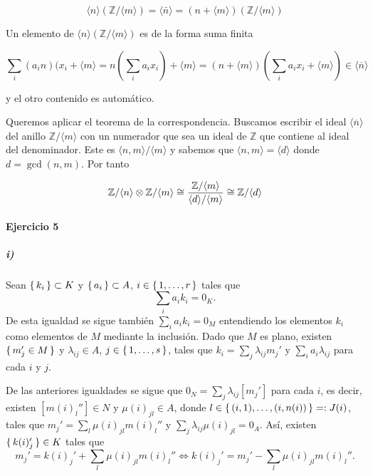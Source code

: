 \documentclass[./ejercicios.tex]{subfiles}
\begin{document}
\begin{equation}
  \langle n \rangle  (\mathbb{Z}/ \langle m \rangle) = \langle \bar n \rangle = (n+\langle m  \rangle) ( \mathbb Z / \langle m\rangle )
\end{equation}

Un elemento de $\langle n \rangle  (\mathbb{Z}/ \langle m \rangle) $ es de la forma suma finita

\begin{equation}
\sum_i (a_i n ) (x_i + \langle m \rangle  = n(  \sum_i a_i x_i) + \langle m \rangle  = (n+ \langle m \rangle)  ( \sum_i a_i x_i + \langle m \rangle) \in \langle \overline n \rangle
\end{equation}

y el otro contenido es automático.

Queremos aplicar el teorema de la correspondencia. Buscamos escribir el ideal $\langle \overline{n} \rangle $ del anillo ${ \mathbb Z}/ \langle m \rangle$ con un numerador que sea un ideal de ${ \mathbb Z}$ que contiene al ideal del denominador. Este es $\langle n,m \rangle / \langle m \rangle$ y sabemos que $\langle n,m \rangle = \langle d \rangle$ donde $d= \gcd(n,m)$. Por tanto

\begin{equation}
  \mathbb{Z}/\langle n\rangle \otimes \mathbb{Z} / \langle m \rangle \cong \frac{\mathbb{Z} / \langle m \rangle }{ \langle d \rangle / \langle m\rangle } \cong \mathbb{Z} / \langle d \rangle
\end{equation}

\paragraph{Ejercicio 5}
\subparagraph{i)} Sean $\set{k_i}\subset K$ y $\set{a_i}\subset A$, $i\in\set{1,\dots,r}$ tales que
$$\sum_{i}a_ik_i=0_K.$$
De esta igualdad se sigue también $\sum_{i}a_ik_i=0_M$ entendiendo los elementos $k_i$ como elementos de $M$ mediante la inclusión. Dado que $M$ es plano, existen $\set{m_j'\in M}$ y $\lambda_{ij}\in A$, $j\in\set{1,\dots, s}$, tales que $k_i=\sum_j\lambda_{ij}m_j'$ y $\sum_i a_i\lambda_{ij}$ para cada $i$ y $j$. 

De las anteriores igualdades se sigue que $0_N=\sum_j\lambda_{ij}[m_j']$ para cada $i$, es decir, existen $[m(i)_{l}'']\in N$ y $\mu(i)_{jl}\in A$, donde $l\in\set{(i,1),\dots,(i,n(i))}=:J(i)$, tales que $m_j'=\sum_l\mu(i)_{jl}m(i)_l''$ y $\sum_{j}\lambda_{ij}\mu(i)_{jl}=0_A.$ Así, existen $\set{k(i)_j'}\in K$ tales que
$$m_j'=k(i)_j'+\sum_l\mu(i)_{jl}m(i)_l''\Longleftrightarrow k(i)_j'=m_{j}'-\sum_{l}\mu(i)_{jl}m(i)_l''.$$
\end{document}
